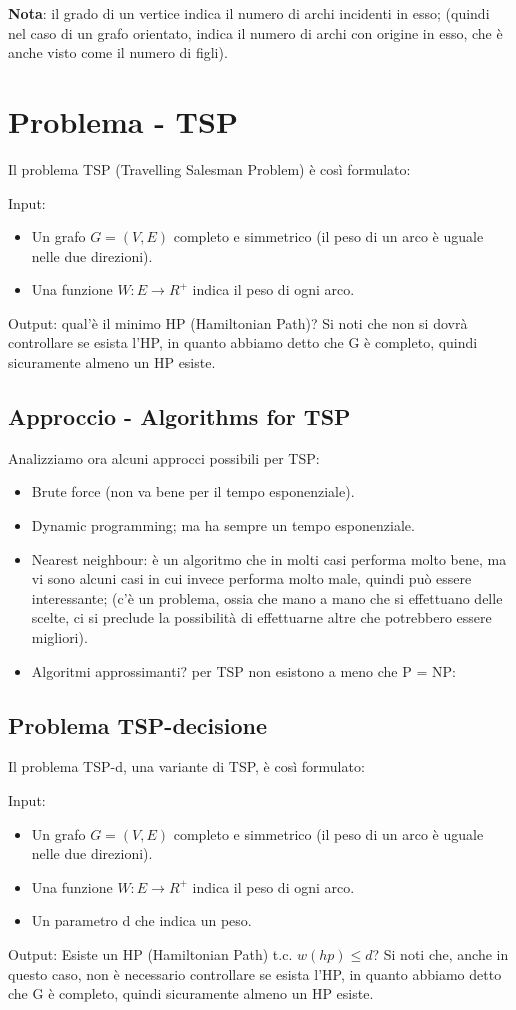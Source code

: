\documentclass[12pt,a4paper]{article}
\begin{document}
\textbf{Nota}: il grado di un vertice indica il numero di archi incidenti in esso; (quindi nel caso di un grafo orientato, indica il numero di archi con origine in esso, che è anche visto come il numero di figli).

\section{Problema - TSP}
Il problema TSP (Travelling Salesman Problem) è così formulato:

Input:
\begin{itemize}
\item Un grafo $G = (V, E)$ completo e simmetrico (il peso di un arco è uguale nelle due direzioni).
\item Una funzione $W: E \rightarrow R^+$ indica il peso di ogni arco.
\end{itemize}
Output: qual'è il minimo HP (Hamiltonian Path)? Si noti che non si dovrà controllare se esista l'HP, in quanto abbiamo detto che G è completo, quindi sicuramente almeno un HP esiste.

\subsection{Approccio - Algorithms for TSP}
Analizziamo ora alcuni approcci possibili per TSP:
\begin{itemize}
\item Brute force (non va bene per il tempo esponenziale).
\item Dynamic programming; ma ha sempre un tempo esponenziale.
\item Nearest neighbour: è un algoritmo che in molti casi performa molto bene, ma vi sono alcuni casi in cui invece performa molto male, quindi può essere interessante; (c'è un problema, ossia che mano a mano che si effettuano delle scelte, ci si preclude la possibilità di effettuarne altre che potrebbero essere migliori).
\item Algoritmi approssimanti? per TSP non esistono a meno che P = NP:
\end{itemize}

\subsection{Problema TSP-decisione}
Il problema TSP-d, una variante di TSP, è così formulato:

Input:
\begin{itemize}
\item Un grafo $G = (V, E)$ completo e simmetrico (il peso di un arco è uguale nelle due direzioni).
\item Una funzione $W: E \rightarrow R^+$ indica il peso di ogni arco.
\item Un parametro d che indica un peso.
\end{itemize}
Output: Esiste un HP (Hamiltonian Path) t.c. $w(hp) \leq d$? Si noti che, anche in questo caso, non è necessario controllare se esista l'HP, in quanto abbiamo detto che G è completo, quindi sicuramente almeno un HP esiste.
\end{document}
